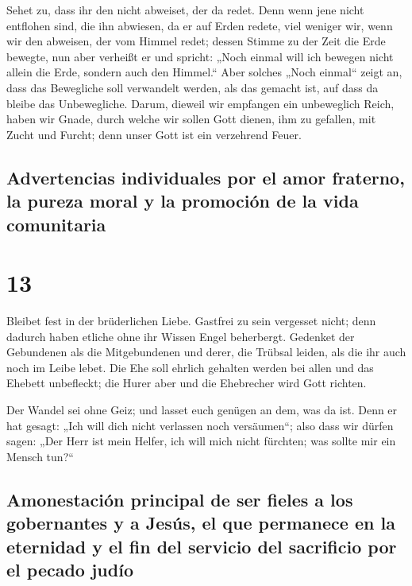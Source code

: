  Sehet zu, dass ihr den nicht abweiset, der da redet.
Denn wenn jene nicht entflohen sind, die ihn abwiesen, da er auf Erden
redete, viel weniger wir, wenn wir den abweisen, der vom Himmel redet;
 dessen Stimme zu der Zeit die Erde bewegte, nun aber
verheißt er und spricht: „Noch einmal will ich bewegen nicht allein die
Erde, sondern auch den Himmel.``  Aber solches „Noch
einmal`` zeigt an, dass das Bewegliche soll verwandelt werden, als das
gemacht ist, auf dass da bleibe das Unbewegliche.  Darum,
dieweil wir empfangen ein unbeweglich Reich, haben wir Gnade, durch
welche wir sollen Gott dienen, ihm zu gefallen, mit Zucht und Furcht;
 denn unser Gott ist ein verzehrend Feuer.

\hypertarget{advertencias-individuales-por-el-amor-fraterno-la-pureza-moral-y-la-promociuxf3n-de-la-vida-comunitaria}{%
\subsection{Advertencias individuales por el amor fraterno, la pureza
moral y la promoción de la vida
comunitaria}\label{advertencias-individuales-por-el-amor-fraterno-la-pureza-moral-y-la-promociuxf3n-de-la-vida-comunitaria}}

\hypertarget{section-12}{%
\section{13}\label{section-12}}

 Bleibet fest in der brüderlichen Liebe. 
Gastfrei zu sein vergesset nicht; denn dadurch haben etliche ohne ihr
Wissen Engel beherbergt.  Gedenket der Gebundenen als die
Mitgebundenen und derer, die Trübsal leiden, als die ihr auch noch im
Leibe lebet.  Die Ehe soll ehrlich gehalten werden bei
allen und das Ehebett unbefleckt; die Hurer aber und die Ehebrecher wird
Gott richten.

 Der Wandel sei ohne Geiz; und lasset euch genügen an dem,
was da ist. Denn er hat gesagt: „Ich will dich nicht verlassen noch
versäumen``;  also dass wir dürfen sagen: „Der Herr ist
mein Helfer, ich will mich nicht fürchten; was sollte mir ein Mensch
tun?{}``

\hypertarget{amonestaciuxf3n-principal-de-ser-fieles-a-los-gobernantes-y-a-jesuxfas-el-que-permanece-en-la-eternidad-y-el-fin-del-servicio-del-sacrificio-por-el-pecado-juduxedo}{%
\subsection{Amonestación principal de ser fieles a los gobernantes y a
Jesús, el que permanece en la eternidad y el fin del servicio del
sacrificio por el pecado
judío}\label{amonestaciuxf3n-principal-de-ser-fieles-a-los-gobernantes-y-a-jesuxfas-el-que-permanece-en-la-eternidad-y-el-fin-del-servicio-del-sacrificio-por-el-pecado-juduxedo}}

